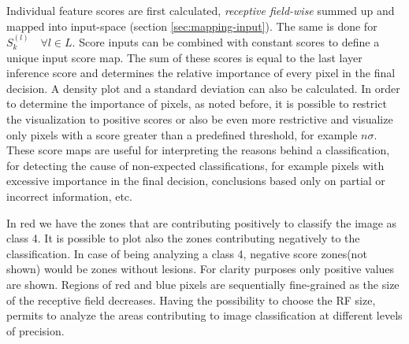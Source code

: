 \documentclass[review]{elsarticle}
\theoremstyle{definition} %
\theoremstyle{remark}
\begin{document}
Individual feature scores are first calculated, \emph{receptive field-wise} summed up and mapped into input-space (section \ref{sec:mapping-input}). The same is done for $S_k^{(l)} \quad \forall l \in L$. Score inputs can be combined with constant scores to define a unique input score map. The sum of these scores is equal to the last layer inference score and determines the relative importance of every pixel in the final decision. A density plot and a standard deviation can also be calculated. In order to determine the importance of pixels, as noted before, it is possible to restrict the visualization to positive scores or also be even more restrictive and visualize only pixels with a score greater than a predefined threshold, for example $n \sigma$. These score maps are useful for interpreting the reasons behind a classification, for detecting the cause of non-expected classifications, for example pixels with excessive importance in the final decision, conclusions based only on partial or incorrect information, etc. 

\vspace{1cm} %
In red we have the zones that are contributing positively to classify the image as class 4. It is possible to plot also the zones contributing negatively to the classification. In case of being analyzing a class 4, negative score zones(not shown) would be zones without lesions. For clarity purposes only positive values are shown. Regions of red and blue pixels are sequentially fine-grained as the size of the receptive field decreases. Having the possibility to choose the RF size, permits to analyze the areas contributing to image classification at different levels of precision.
\end{document}
